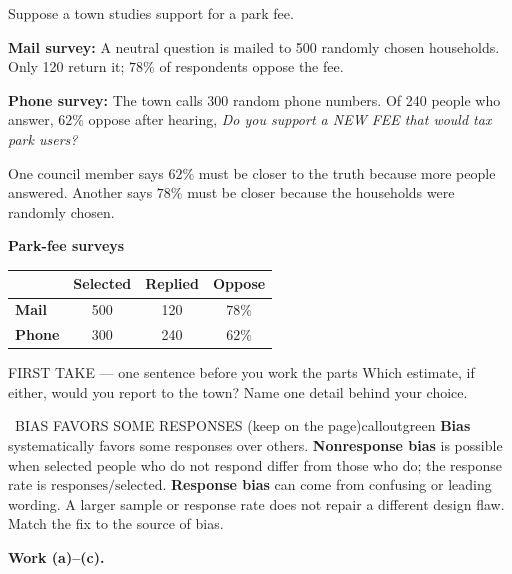 \documentclass[11pt]{article}
\begin{document}


Suppose a town studies support for a park fee.\par\smallskip \textbf{Mail survey:} A neutral question is mailed to 500 randomly chosen households. Only 120 return it; $78\%$ of respondents oppose the fee.\par \textbf{Phone survey:} The town calls 300 random phone numbers. Of 240 people who answer, $62\%$ oppose after hearing, \emph{Do you support a NEW FEE that would tax park users?}\par\smallskip One council member says $62\%$ must be closer to the truth because more people answered. Another says $78\%$ must be closer because the households were randomly chosen.\par
\begin{center}
\textbf{Park-fee surveys}\par\smallskip
\begin{tabular}{|l|c|c|c|}
\hline
\textbf{} & \textbf{Selected} & \textbf{Replied} & \textbf{Oppose} \\ \hline
\textbf{Mail} & 500 & 120 & $78\%$ \\ \hline
\textbf{Phone} & 300 & 240 & $62\%$ \\ \hline
\end{tabular}
\end{center}
\begin{firsttakebox}{FIRST TAKE --- one sentence before you work the parts}
Which estimate, if either, would you report to the town? Name one detail behind your choice.
\workspace{0.9in}
\end{firsttakebox}

\begin{callout}{\IconBook\ BIAS FAVORS SOME RESPONSES (keep on the page)}{calloutgreen}
\textbf{Bias} systematically favors some responses over others. \textbf{Nonresponse bias} is possible when
selected people who do not respond differ from those who do; the response rate is
$\text{responses}/\text{selected}$. \textbf{Response bias} can come from confusing or leading wording.
A larger sample or response rate does not repair a different design flaw. Match the fix to the source of bias.
\end{callout}

\newpage
\textbf{Work (a)--(c).}\par\smallskip
\end{document}
